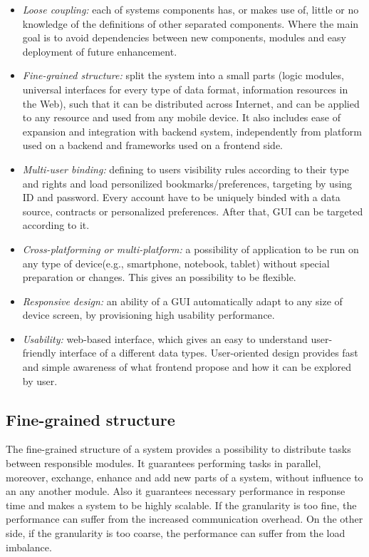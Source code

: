 \begin{itemize}
\item \emph{Loose coupling:} each of systems components has, or makes use of, little or no knowledge of the definitions of other separated components. Where the main goal is to avoid dependencies between new components, modules and easy deployment of future enhancement.
\item \emph{Fine-grained structure:} split the system into a small parts (logic modules, universal interfaces for every type of data format, information resources in the Web), such that it can be distributed across Internet, and can be applied to any resource and used from any mobile device. It also includes ease of expansion and integration with backend system, independently from platform used on a backend and frameworks used on a frontend side.
\item \emph{Multi-user binding:} defining to users visibility rules according to their type and rights and load personilized bookmarks/preferences, targeting by using ID and password. Every account have to be uniquely binded with a data source, contracts or personalized preferences. After that, GUI can be targeted according to it.
\item \emph{Cross-platforming or multi-platform:} a possibility of application to be run on any type of device(e.g., smartphone, notebook, tablet) without special preparation or changes. This gives an possibility to be flexible.
\item \emph{Responsive design:} an ability of a GUI automatically adapt to any size of device screen, by provisioning high usability performance.
\item \emph{Usability:} web-based interface, which gives an easy to understand user-friendly interface of a different data types. User-oriented design provides fast and simple awareness of what frontend propose and how it can be explored by user.
\end{itemize} 

\subsection {Fine-grained structure}
The fine-grained structure of a system provides a possibility to distribute tasks between responsible modules. It guarantees performing tasks in parallel, moreover, exchange, enhance and add new parts of a system, without influence to an any another module. Also it guarantees necessary performance in response time and makes a system to be highly scalable. If the granularity is too fine, the performance can suffer from the increased communication overhead. On the other side, if the granularity is too coarse, the performance can suffer from the load imbalance.

